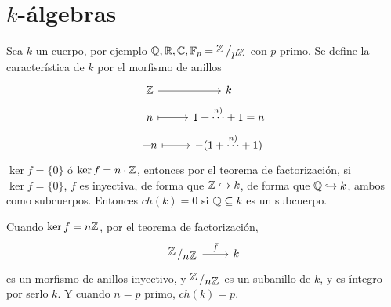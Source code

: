 \chapter{$k$-\'algebras} \justifying
Sea $k$ un cuerpo, por ejemplo $\bb Q, \bb R, \bb C, \bb F_p = \modulo{\bb Z}{p\bb Z}$ con $p$ primo. 
Se define  la caracter\'istica de $k$ por el morfismo de anillos
    $$\bt \bb Z\rar & k \\[-5mm] n \rarmaps & 1+\overset{n)}{\cdots} + 1 = n\\[-5mm] -n \rarmaps & -(1+\overset{n)}{\cdots} + 1) \et$$
    $\ker f = \{0\}$ \'o $\ker f = n \cdot \mathbb{Z}$, entonces por el teorema de factorizaci\'on, si $\ker f = \{0\}$, $f$ es inyectiva, de forma que $\mathbb{Z} \hookrightarrow k$, de forma que $\mathbb{Q} \hookrightarrow k$, ambos como subcuerpos. Entonces $ch(k) = 0$ si $\mathbb{Q} \subseteq k$ es un subcuerpo.

    Cuando $\ker f = n \mathbb{Z}$, por el teorema de factorizaci\'on, 
    $$\bt \modulo{\bb Z}{n \bb Z} \rar{\bar f} & k  \et$$
    es un morfismo de anillos inyectivo, y $\modulo{\bb Z}{n \bb Z}$ es un subanillo de $k$, y es \'integro por serlo $k$. Y cuando $n = p$ primo, $ch(k) = p$. 

